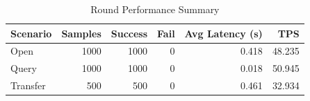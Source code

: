 \begin{table}
\caption{Round Performance Summary}
\label{tab:round_perf}
\begin{tabular}{lrrrrr}
\toprule
Scenario & Samples & Success & Fail & Avg Latency (s) & TPS \\
\midrule
Open & 1000 & 1000 & 0 & 0.418 & 48.235 \\
Query & 1000 & 1000 & 0 & 0.018 & 50.945 \\
Transfer & 500 & 500 & 0 & 0.461 & 32.934 \\
\bottomrule
\end{tabular}
\end{table}
